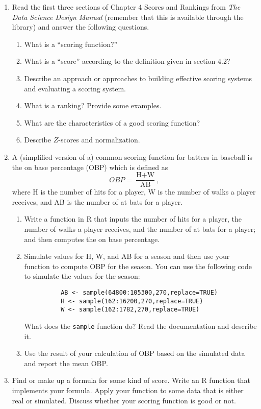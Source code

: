 \documentclass[12pt]{article}
\begin{document}
\begin{enumerate}
    \item Read the first three sections of Chapter 4 Scores and Rankings from \emph{The Data Science Design Manual} (remember that this is available through the library) and answer the following questions.
     \begin{enumerate}
      \item  What is a ``scoring function?''
      \item What is a ``score'' according to the definition given in section 4.2?
      \item Describe an approach or approaches to building effective scoring systems and evaluating a scoring system. 
      \item What is a ranking? Provide some examples. 
      \item What are the characteristics of a good scoring function? 
      \item Describe $Z$-scores and normalization.       
    \end{enumerate}
    \item A (simplified version of a) common scoring function for batters in baseball is the on base percentage (OBP) which is defined as
    \[  OBP = \frac{\text{H} + \text{W}}{\text{AB}}, \]
    where  H is the number of hits for a player, W is the number of walks a player receives, and AB is the number of at bats for a player. 
    \begin{enumerate}
      \item Write a function in R that inputs the number of hits for a player, the number of walks a player receives, and the number of at bats for a player; and then computes the on base percentage. 
      \item Simulate values for H, W, and AB for a season and then use your function to compute OBP for the season. You can use the following code to simulate the values for the season:
      \begin{verbatim}
          AB <- sample(64800:105300,270,replace=TRUE)
          H <- sample(162:16200,270,replace=TRUE)
          W <- sample(162:1782,270,replace=TRUE)
      \end{verbatim}
      What does the {\tt sample} function do? Read the documentation and describe it. 
      \item Use the result of your calculation of OBP based on the simulated  data and report the mean OBP. 
    \end{enumerate}   
    \item Find or make up a formula for some kind of score. Write an R function that implements your formula. Apply your function to some data that is either real or simulated.  Discuss whether your scoring function is good or not.  

\end{enumerate}
\end{document}
